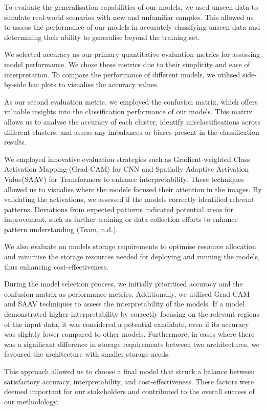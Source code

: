 \documentclass[letterpaper,9pt,twocolumn,twoside,]{pinp}
\begin{document}
To evaluate the generalisation capabilities of our models, we used
unseen data to simulate real-world scenarios with new and unfamiliar
samples. This allowed us to assess the performance of our models in
accurately classifying unseen data and determining their ability to
generalise beyond the training set.

We selected accuracy as our primary quantitative evaluation metrics for
assessing model performance. We chose these metrics due to their
simplicity and ease of interpretation. To compare the performance of
different models, we utilised side-by-side bar plots to visualise the
accuracy values.

As our second evaluation metric, we employed the confusion matrix, which
offers valuable insights into the classification performance of our
models. This matrix allows us to analyse the accuracy of each cluster,
identify misclassifications across different clusters, and assess any
imbalances or biases present in the classification results.

We employed innovative evaluation strategies such as Gradient-weighted
Class Activation Mapping (Grad-CAM) for CNN and Spatially Adaptive
Activation Value(SAAV) for Transformers to enhance interpretability.
These techniques allowed us to visualise where the models focused their
attention in the images. By validating the activations, we assessed if
the models correctly identified relevant patterns. Deviations from
expected patterns indicated potential areas for improvement, such as
further training or data collection efforts to enhance pattern
understanding (Team, n.d.).

We also evaluate on models storage requirements to optimise resource
allocation and minimise the storage resources needed for deploying and
running the models, thus enhancing cost-effectiveness.

During the model selection process, we initially prioritised accuracy
and the confusion matrix as performance metrics. Additionally, we
utilised Grad-CAM and SAAV techniques to assess the interpretability of
the models. If a model demonstrated higher interpretability by correctly
focusing on the relevant regions of the input data, it was considered a
potential candidate, even if its accuracy was slightly lower compared to
other models. Furthermore, in cases where there was a significant
difference in storage requirements between two architectures, we
favoured the architecture with smaller storage needs.

This approach allowed us to choose a final model that struck a balance
between satisfactory accuracy, interpretability, and cost-effectiveness.
These factors were deemed important for our stakeholders and contributed
to the overall success of our methodology.
\end{document}
